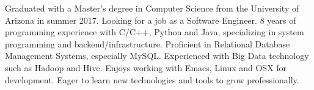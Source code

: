 

\begin{cvparagraph}

Graduated with a Master's degree in Computer Science from the
University of Arizona in summer 2017. Looking for a job as a Software
Engineer. 8 years of programming experience with C/C++, Python and
Java, specializing in system programming and
backend/infrastructure. Proficient in Relational Database Management
Systems, especially MySQL. Experienced with Big Data technology such
as Hadoop and Hive. Enjoys working with Emacs, Linux and OSX for
development. Eager to learn new technologies and tools to grow
professionally.
\end{cvparagraph}
